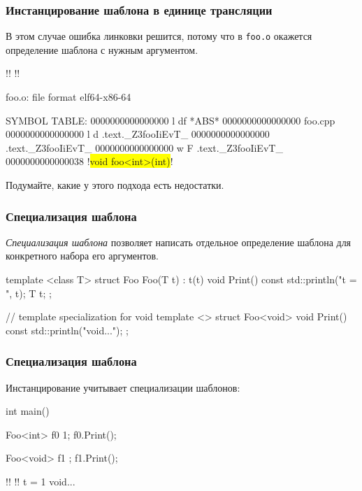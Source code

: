 \documentclass[compress, 8pt, aspectratio=169]{beamer}
\begin{document}
  \begin{frame}[fragile]

    \frametitle{Инстанцирование шаблона в единице трансляции}

    В этом случае ошибка линковки решится, потому что в \verb|foo.o|
    окажется определение шаблона с нужным аргументом.

    \begin{terminalwindow}
!!
!!

foo.o:     file format elf64-x86-64

SYMBOL TABLE:
0000000000000000 l    df *ABS*  0000000000000000 foo.cpp
0000000000000000 l    d  .text._Z3fooIiEvT_     0000000000000000 .text._Z3fooIiEvT_
0000000000000000  w    F .text._Z3fooIiEvT_     0000000000000038 !\colorbox{yellow}{void foo<int>(int)}!
    \end{terminalwindow}

    \begin{task}
      Подумайте, какие у этого подхода есть недостатки.
    \end{task}

  \end{frame}

  \begin{frame}[fragile]

    \frametitle{Специализация шаблона}

    \textit{Специализация шаблона}\footnotemark{}
    позволяет написать отдельное определение
    шаблона для конкретного набора его аргументов.


    \begin{myinplacelisting}[minted language=cpp]
template <class T>
struct Foo {
    Foo(T t) : t(t) {}
    void Print() const {
        std::println("t = {}", t);
    }
    T t;
};

// template specialization for void
template <>
struct Foo<void> {
    void Print() const {
        std::println("void...");
    }
};
    \end{myinplacelisting}

  \end{frame}

  \begin{frame}[fragile]

    \frametitle{Специализация шаблона}

    Инстанцирование учитывает специализации шаблонов:

    \begin{myinplacelisting}[minted language=cpp]
int main() {
    Foo<int> f0 {1};
    f0.Print();

    Foo<void> f1 {};
    f1.Print();
}
    \end{myinplacelisting}

    \begin{terminalwindow}
!!
!!
t = 1
void...
    \end{terminalwindow}

  \end{frame}
\end{document}
